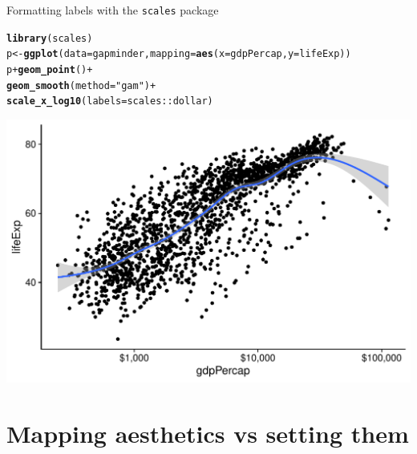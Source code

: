 \documentclass[10pt,handout]{beamer}\usepackage[]{graphicx}\usepackage[]{color}
\makeatletter
\def\maxwidth{ %
  \ifdim\Gin@nat@width>\linewidth
    \linewidth
  \else
    \Gin@nat@width
  \fi
}
\newcommand{\hlstr}[1]{\textcolor[rgb]{0.192,0.494,0.8}{#1}}%
\newcommand{\hlopt}[1]{\textcolor[rgb]{0,0,0}{#1}}%
\newcommand{\hlstd}[1]{\textcolor[rgb]{0.345,0.345,0.345}{#1}}%
\newcommand{\hlkwb}[1]{\textcolor[rgb]{0.69,0.353,0.396}{#1}}%
\newcommand{\hlkwc}[1]{\textcolor[rgb]{0.333,0.667,0.333}{#1}}%
\newcommand{\hlkwd}[1]{\textcolor[rgb]{0.737,0.353,0.396}{\textbf{#1}}}%
\newenvironment{kframe}{%
 \def\at@end@of@kframe{}%
 \ifinner\ifhmode%
  \def\at@end@of@kframe{\end{minipage}}%
  \begin{minipage}{\columnwidth}%
 \fi\fi%
 \def\FrameCommand##1{\hskip\@totalleftmargin \hskip-\fboxsep
 \colorbox{shadecolor}{##1}\hskip-\fboxsep
     \hskip-\linewidth \hskip-\@totalleftmargin \hskip\columnwidth}%
 \MakeFramed {\advance\hsize-\width
   \@totalleftmargin\z@ \linewidth\hsize
   \@setminipage}}%
 {\par\unskip\endMakeFramed%
 \at@end@of@kframe}
\newenvironment{knitrout}{}{} %
\makeatother
\begin{document}
\begin{frame}[fragile]{Formatting labels with the \texttt{scales} package}
\begin{knitrout}\tiny
{}\color{fgcolor}\begin{kframe}
\begin{alltt}
\hlkwd{library}\hlstd{(scales)}
\hlstd{p} \hlkwb{<-} \hlkwd{ggplot}\hlstd{(}\hlkwc{data} \hlstd{= gapminder,} \hlkwc{mapping} \hlstd{=} \hlkwd{aes}\hlstd{(}\hlkwc{x} \hlstd{= gdpPercap,} \hlkwc{y}\hlstd{=lifeExp))}
\hlstd{p} \hlopt{+} \hlkwd{geom_point}\hlstd{()} \hlopt{+}
        \hlkwd{geom_smooth}\hlstd{(}\hlkwc{method} \hlstd{=} \hlstr{"gam"}\hlstd{)} \hlopt{+}
        \hlkwd{scale_x_log10}\hlstd{(}\hlkwc{labels} \hlstd{= scales}\hlopt{::}\hlstd{dollar)}
\end{alltt}
\end{kframe}

{\centering \includegraphics[width=\maxwidth]{figure/unnamed-chunk-10-1} 

}


\end{knitrout}

\end{frame}



\section{Mapping aesthetics vs setting them}
\end{document}
